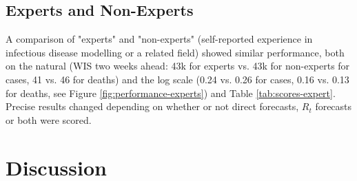 \documentclass[10pt,a4paper,twocolumn]{article}
\begin{document}
\subsection*{Experts and Non-Experts}

A comparison of "experts" and "non-experts" (self-reported experience in infectious disease modelling or a related field) showed similar performance, both on the natural (WIS two weeks ahead: 43k for experts vs. 43k for non-experts for cases, 41 vs. 46 for deaths) and the log scale (0.24 vs. 0.26 for cases, 0.16 vs. 0.13 for deaths, see Figure \ref{fig:performance-experts}) and Table \ref{tab:scores-expert}. Precise results changed depending on whether or not direct forecasts, $R_t$ forecasts or both were scored. 


\section*{Discussion}

\end{document}
